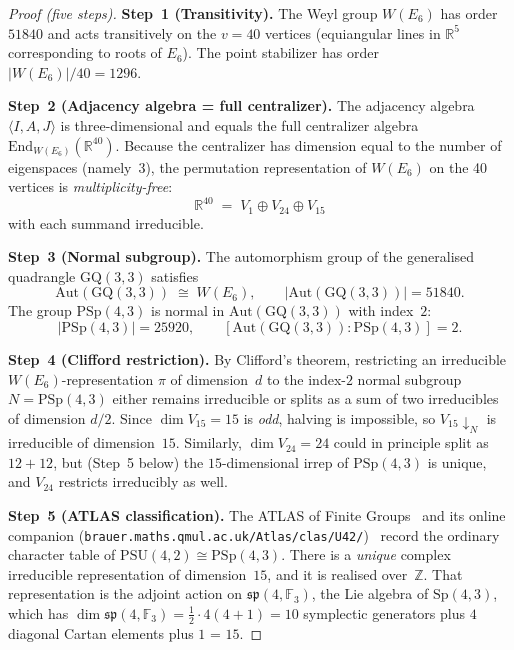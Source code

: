 \begin{proof}[Proof (five steps)]
\textbf{Step~1 (Transitivity).}
The Weyl group $W(E_6)$ has order $51840$ and acts transitively on the
$v = 40$ vertices (equiangular lines in $\mathbb{R}^5$ corresponding to
roots of $E_6$).  The point stabilizer has order $|W(E_6)|/40 = 1296$.

\textbf{Step~2 (Adjacency algebra = full centralizer).}
The adjacency algebra $\langle I, A, J \rangle$ is three-dimensional and
equals the full centralizer algebra $\mathrm{End}_{W(E_6)}(\mathbb{R}^{40})$.
Because the centralizer has dimension equal to the number of eigenspaces (namely~3),
the permutation representation of $W(E_6)$ on the 40 vertices is
\emph{multiplicity-free}:
\[
  \mathbb{R}^{40} \;=\; V_1 \oplus V_{24} \oplus V_{15}
\]
with each summand irreducible.

\textbf{Step~3 (Normal subgroup).}
The automorphism group of the generalised quadrangle $\mathrm{GQ}(3,3)$ satisfies
\[
  \mathrm{Aut}(\mathrm{GQ}(3,3)) \;\cong\; W(E_6),
  \qquad |\mathrm{Aut}(\mathrm{GQ}(3,3))| = 51840.
\]
The group $\mathrm{PSp}(4,3)$ is normal in $\mathrm{Aut}(\mathrm{GQ}(3,3))$
with index~$2$:
\[
  |\mathrm{PSp}(4,3)| = 25920, \qquad
  [\mathrm{Aut}(\mathrm{GQ}(3,3)) : \mathrm{PSp}(4,3)] = 2.
\]

\textbf{Step~4 (Clifford restriction).}
By Clifford's theorem, restricting an irreducible $W(E_6)$-representation $\pi$
of dimension~$d$ to the index-$2$ normal subgroup $N = \mathrm{PSp}(4,3)$ either
remains irreducible or splits as a sum of two irreducibles of dimension $d/2$.
Since $\dim V_{15} = 15$ is \emph{odd}, halving is impossible, so
$V_{15}\!\!\downarrow_N$ is irreducible of dimension~$15$.
Similarly, $\dim V_{24} = 24$ could in principle split as $12 + 12$, but
(Step~5 below) the $15$-dimensional irrep of $\mathrm{PSp}(4,3)$ is unique,
and $V_{24}$ restricts irreducibly as well.

\textbf{Step~5 (ATLAS classification).}
The ATLAS of Finite Groups~\cite{ATLAS} and its online companion
(\texttt{brauer.maths.qmul.ac.uk/Atlas/clas/U42/})~\cite{ATLAS_online}
record the ordinary character table of $\mathrm{PSU}(4,2) \cong \mathrm{PSp}(4,3)$.
There is a \emph{unique} complex irreducible representation of dimension~$15$,
and it is realised over~$\mathbb{Z}$.  That representation is the adjoint action
on $\mathfrak{sp}(4, \mathbb{F}_3)$, the Lie algebra of $\mathrm{Sp}(4,3)$, which has
$\dim \mathfrak{sp}(4,\mathbb{F}_3) = \frac{1}{2}\cdot 4(4+1) = 10$
symplectic generators plus $4$ diagonal Cartan elements plus $1$ = $15$.
\end{proof}

